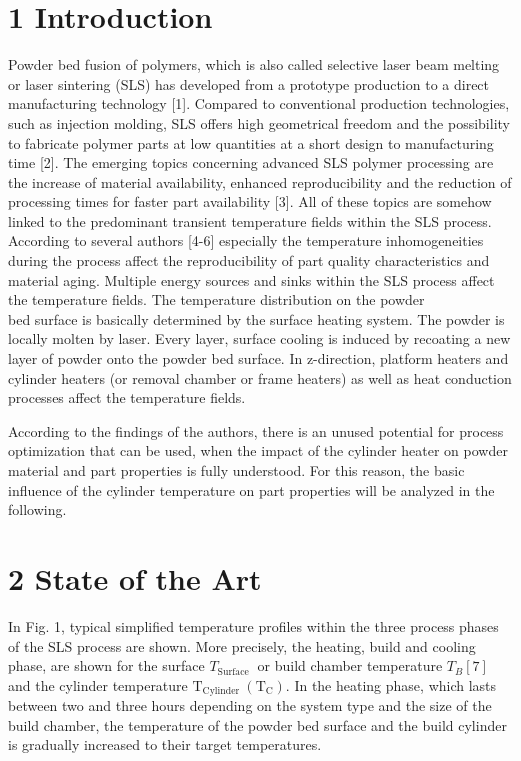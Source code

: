 \documentclass[10pt]{article}
\begin{document}
\section*{1 Introduction}
Powder bed fusion of polymers, which is also called selective laser beam melting or laser sintering (SLS) has developed from a prototype production to a direct manufacturing technology [1]. Compared to conventional production technologies, such as injection molding, SLS offers high geometrical freedom and the possibility to fabricate polymer parts at low quantities at a short design to manufacturing time [2]. The emerging topics concerning advanced SLS polymer processing are the increase of material availability, enhanced reproducibility and the reduction of processing times for faster part availability [3]. All of these topics are somehow linked to the predominant transient temperature fields within the SLS process. According to several authors [4-6] especially the temperature inhomogeneities during the process affect the reproducibility of part quality characteristics and material aging. Multiple energy sources and sinks within the SLS process affect the temperature fields. The temperature distribution on the powder\\
bed surface is basically determined by the surface heating system. The powder is locally molten by laser. Every layer, surface cooling is induced by recoating a new layer of powder onto the powder bed surface. In z-direction, platform heaters and cylinder heaters (or removal chamber or frame heaters) as well as heat conduction processes affect the temperature fields.

According to the findings of the authors, there is an unused potential for process optimization that can be used, when the impact of the cylinder heater on powder material and part properties is fully understood. For this reason, the basic influence of the cylinder temperature on part properties will be analyzed in the following.

\section*{2 State of the Art}
In Fig. 1, typical simplified temperature profiles within the three process phases of the SLS process are shown. More precisely, the heating, build and cooling phase, are shown for the surface $T_{\text {Surface }}$ or build chamber temperature $T_{B}[7]$ and the cylinder temperature $\mathrm{T}_{\text {Cylinder }}\left(\mathrm{T}_{\mathrm{C}}\right)$. In the heating phase, which lasts between two and three hours depending on the system type and the size of the build chamber, the temperature of the powder bed surface and the build cylinder is gradually increased to their target temperatures.
\end{document}
